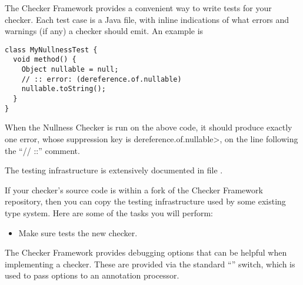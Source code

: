 The Checker Framework provides a convenient way to write tests for your
checker.  Each test case is a Java file, with inline indications of what
errors and warnings (if any) a checker should emit.  An example is

\begin{Verbatim}
class MyNullnessTest {
  void method() {
    Object nullable = null;
    // :: error: (dereference.of.nullable)
    nullable.toString();
  }
}
\end{Verbatim}

\noindent
When the Nullness Checker is run on the above code, it should produce
exactly one error, whose suppression key is \<dereference.of.nullable>, on
the line following the ``// ::'' comment.

The testing infrastructure is extensively documented in file .

If your checker's source code is within a fork of the Checker Framework
repository, then you can copy the testing infrastructure used by some
existing type system.  Here are some of the tasks you will perform:

\begin{itemize}

\item Make sure  tests the new checker.
\end{itemize}



The Checker Framework provides debugging options that can be helpful when
implementing a checker. These are provided via the standard  ``''
switch, which is used to pass options to an annotation processor.



